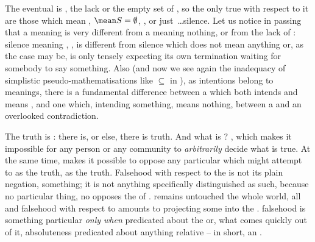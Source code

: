 
\pa The eventual  is , the lack or the empty
set of , so the only  true with respect to it are
those which mean , $\mean S=\emptyset$, , 
or just~\ldots silence.  Let us notice in passing that a  meaning
 is very different from a  meaning nothing, or from the
lack of : silence meaning , ,
is different from silence which does not mean anything or, as the case may be,
is only tensely expecting its own termination waiting for somebody to say
something.
Also (and now we see again the inadequacy of simplistic pseudo-mathematisations
like $\subseteq$ in ), as intentions belong to meanings, there
is a fundamental difference between a  which both intends and means
, and one which, intending something, means nothing,
 between a  and an overlooked contradiction.

The  truth is :  there is, or else, 
there is truth. And what is ? ,  which makes 
it impossible for any person or any community to {\em arbitrarily} decide
what is true. At the same time,  makes it possible to oppose any
particular  which  might attempt to  as the
truth, as the  truth.  Falsehood with respect to the
 is not its plain negation, something; it is not anything
specifically distinguished as such, because no particular thing, no
 opposes the  of .
 remains untouched  the whole world,  all
 and falsehood with respect to  amounts to projecting
some  into the . 
 falsehood is something particular {\em only when} 
predicated about the  or, what comes quickly out of it,
absoluteness predicated about anything relative -- in short, an .


